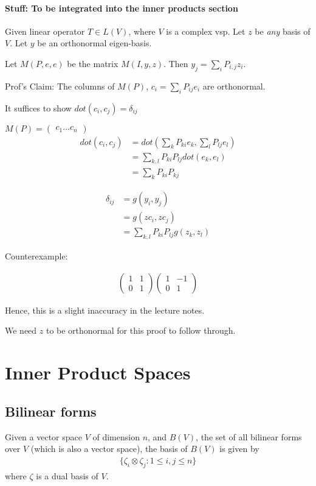 \documentclass{article}
\begin{document}
\paragraph{Stuff: To be integrated into the inner products section}

Given linear operator $T\in L(V)$, where $V$ is a complex vsp. Let $z$ be \textit{any} basis of $V$. Let $y$ be an orthonormal eigen-basis.

Let $M(P, e, e)$ be the matrix $M(I, y, z)$.
Then $y_j = \sum_{i}P_{i,j}z_i$.

Prof's Claim: The columns of $M(P)$, $c_i=\sum_{i}P_{ij}e_i$ are orthonormal.

It suffices to show $dot(c_i, c_j)=\delta_{ij}$

$M(P)=\begin{pmatrix}
c_1 \dots c_n
\end{pmatrix}
$
\begin{align*}
dot(c_i, c_j) &= dot(\sum_kP_{ki}e_k,\sum_lP_{lj}e_l)\\
&=\sum_{k,l}P_{ki}P_{lj}dot(e_k,e_l)\\
&=
\sum_{k}P_{ki}P_{kj}
\end{align*}

\begin{align*}
\delta_{ij} &= g(y_i,y_j)\\&=g(zc_i, zc_j) \\&= \sum_{k,l}P_{ki}P_{lj}g(z_k,z_l)
\end{align*}

Counterexample:

\begin{align*}
\begin{pmatrix}
1 & 1\\
0 & 1 
\end{pmatrix}
\begin{pmatrix}
1 & -1\\
0 & 1 
\end{pmatrix}
\end{align*}

Hence, this is a slight inaccuracy in the lecture notes.

We need $z$ to be orthonormal for this proof to follow through.



\section{Inner Product Spaces}
\subsection{Bilinear forms}
Given a vector space $V$ of dimension $n$, and $B(V)$, the set of all bilinear forms over $V$ (which is also a vector space), the basis of $B(V)$ is given by
\begin{align*}
	\{\zeta_i\otimes \zeta_j: 1\leq i,j\leq n\}
\end{align*} 
where $\zeta$ is a dual basis of $V$.
\end{document}
